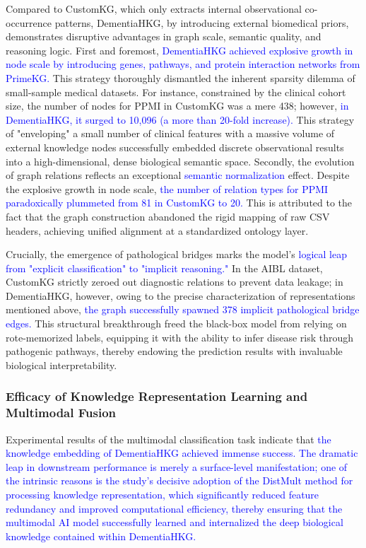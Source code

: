 \documentclass[lettersize,journal]{IEEEtran}
\begin{document}
Compared to CustomKG, which only extracts internal observational co-occurrence patterns, DementiaHKG, by introducing external biomedical priors, demonstrates disruptive advantages in graph scale, semantic quality, and reasoning logic. First and foremost, \textcolor{blue}{DementiaHKG achieved explosive growth in node scale by introducing genes, pathways, and protein interaction networks from PrimeKG.} This strategy thoroughly dismantled the inherent sparsity dilemma of small-sample medical datasets. For instance, constrained by the clinical cohort size, the number of nodes for PPMI in CustomKG was a mere 438; however, \textcolor{blue}{in DementiaHKG, it surged to 10,096 (a more than 20-fold increase).} This strategy of "enveloping" a small number of clinical features with a massive volume of external knowledge nodes successfully embedded discrete observational results into a high-dimensional, dense biological semantic space. Secondly, the evolution of graph relations reflects an exceptional \textcolor{blue}{semantic normalization} effect. Despite the explosive growth in node scale, \textcolor{blue}{the number of relation types for PPMI paradoxically plummeted from 81 in CustomKG to 20.} This is attributed to the fact that the graph construction abandoned the rigid mapping of raw CSV headers, achieving unified alignment at a standardized ontology layer.

Crucially, the emergence of pathological bridges marks the model's \textcolor{blue}{logical leap from "explicit classification" to "implicit reasoning."} In the AIBL dataset, CustomKG strictly zeroed out diagnostic relations to prevent data leakage; in DementiaHKG, however, owing to the precise characterization of representations mentioned above, \textcolor{blue}{the graph successfully spawned 378 implicit pathological bridge edges.} This structural breakthrough freed the black-box model from relying on rote-memorized labels, equipping it with the ability to infer disease risk through pathogenic pathways, thereby endowing the prediction results with invaluable biological interpretability.

\subsubsection{Efficacy of Knowledge Representation Learning and Multimodal Fusion}

    Experimental results of the multimodal classification task indicate that \textcolor{blue}{the knowledge embedding of DementiaHKG achieved immense success. The dramatic leap in downstream performance is merely a surface-level manifestation; one of the intrinsic reasons is the study's decisive adoption of the DistMult method for processing knowledge representation, which significantly reduced feature redundancy and improved computational efficiency, thereby ensuring that the multimodal AI model successfully learned and internalized the deep biological knowledge contained within DementiaHKG.}
\end{document}
